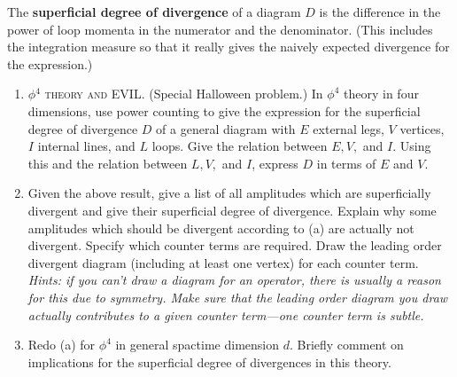 \documentclass[12pt]{article}
\begin{document}
\begin{enumerate}
The \textbf{superficial degree of divergence} of a diagram $D$ is the difference in the power of loop momenta in the numerator and the denominator. (This includes the integration measure so that it really gives the naively expected divergence for the expression.)

\begin{enumerate}
\item \textsc{$\phi^4$ theory and EVIL}. (Special Halloween problem.) In $\phi^4$ theory in four dimensions, use power counting to give the expression for the superficial degree of divergence $D$ of a general diagram with $E$ external legs, $V$ vertices, $I$ internal lines, and $L$ loops. Give the relation between $E,V,$ and $I$. Using this and the relation between $L,V,$ and $I$, express $D$ in terms of $E$ and $V$.
\item Given the above result, give a list of all amplitudes which are superficially divergent and give their superficial degree of divergence. Explain why some amplitudes which should be divergent according to (a) are actually not divergent. Specify which counter terms are required. Draw the leading order divergent diagram (including at least one vertex) for each counter term. \textit{Hints: if you can't draw a diagram for an operator, there is usually a reason for this due to symmetry. Make sure that the leading order diagram you draw actually contributes to a given counter term---one counter term is subtle.} 
\item Redo (a) for $\phi^4$ in general spactime dimension $d$. Briefly comment on implications for the superficial degree of divergences in this theory.
\end{enumerate}



%
%
%
%



\end{enumerate}
\end{document}
